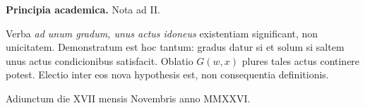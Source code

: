 \documentclass[11pt,a4paper]{article}
\begin{document}
\noindent\textbf{Principia academica.} Nota ad II.

\medskip
Verba \emph{ad unum gradum, unus actus idoneus} existentiam significant, non unicitatem.
Demonstratum est hoc tantum: gradus datur si et solum si saltem unus actus condicionibus satisfacit.
Oblatio \(G(w,x)\) plures tales actus continere potest.
Electio inter eos nova hypothesis est, non consequentia definitionis.

\medskip
\noindent\textnormal{Adiunctum die XVII mensis Novembris anno MMXXVI.}
\end{document}
